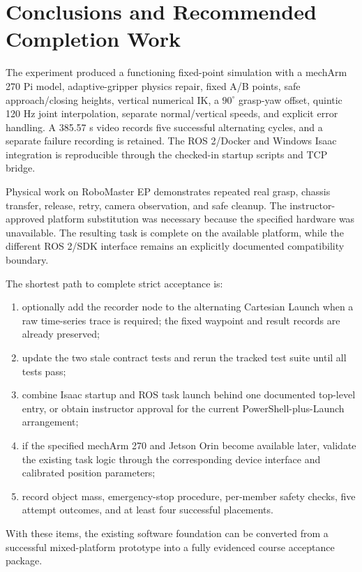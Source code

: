\documentclass[UTF8,zihao=-4,scheme=chinese,fontset=none]{ctexart}
\begin{document}
\section{Conclusions and Recommended Completion Work}
The experiment produced a functioning fixed-point simulation with a mechArm 270 Pi model, adaptive-gripper physics repair, fixed A/B points, safe approach/closing heights, vertical numerical IK, a $90^{\circ}$ grasp-yaw offset, quintic 120 Hz joint interpolation, separate normal/vertical speeds, and explicit error handling. A 385.57 s video records five successful alternating cycles, and a separate failure recording is retained. The ROS 2/Docker and Windows Isaac integration is reproducible through the checked-in startup scripts and TCP bridge.

Physical work on RoboMaster EP demonstrates repeated real grasp, chassis transfer, release, retry, camera observation, and safe cleanup. The instructor-approved platform substitution was necessary because the specified hardware was unavailable. The resulting task is complete on the available platform, while the different ROS 2/SDK interface remains an explicitly documented compatibility boundary.

The shortest path to complete strict acceptance is:
\begin{enumerate}
\item optionally add the recorder node to the alternating Cartesian Launch when a raw time-series trace is required; the fixed waypoint and result records are already preserved;
\item update the two stale contract tests and rerun the tracked test suite until all tests pass;
\item combine Isaac startup and ROS task launch behind one documented top-level entry, or obtain instructor approval for the current PowerShell-plus-Launch arrangement;
\item if the specified mechArm 270 and Jetson Orin become available later, validate the existing task logic through the corresponding device interface and calibrated position parameters;
\item record object mass, emergency-stop procedure, per-member safety checks, five attempt outcomes, and at least four successful placements.
\end{enumerate}
With these items, the existing software foundation can be converted from a successful mixed-platform prototype into a fully evidenced course acceptance package.

\clearpage
\appendix
\end{document}
